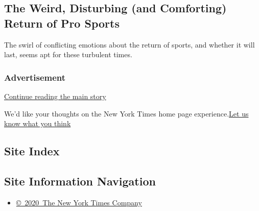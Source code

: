 \href{/2020/08/07/style/coronavirus-nyc-historic-season.html}{}

\href{/2020/08/07/sports/coronavirus-restart-nba-baseball.html}{}

\hypertarget{the-weird-disturbing-and-comforting-return-of-pro-sports}{%
\subsection{The Weird, Disturbing (and Comforting) Return of Pro
Sports}\label{the-weird-disturbing-and-comforting-return-of-pro-sports}}

The swirl of conflicting emotions about the return of sports, and
whether it will last, seems apt for these turbulent times.

\href{/2020/08/07/sports/coronavirus-restart-nba-baseball.html}{}

\hypertarget{advertisement}{%
\subsubsection{Advertisement}\label{advertisement}}

\protect\hyperlink{after-dfp-ad-mid1-large}{Continue reading the main
story}

We'd like your thoughts on the New York Times home page
experience.\href{http://nyt.qualtrics.com/jfe/form/SV_eFJmKj9v0krSE0l}{Let
us know what you think}

\hypertarget{site-index}{%
\subsection{Site Index}\label{site-index}}

\hypertarget{site-information-navigation}{%
\subsection{Site Information
Navigation}\label{site-information-navigation}}

\begin{itemize}
\tightlist
\item
  \href{https://help.nytimes.com/hc/en-us/articles/115014792127-Copyright-notice}{©~2020~The
  New York Times Company}
\end{itemize}

